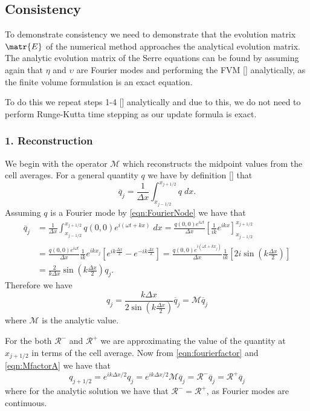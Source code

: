 \subsection{Consistency}
To demonstrate consistency we need to demonstrate that the evolution matrix $\matr{E}$ of the numerical method approaches the analytical evolution matrix. The analytic evolution matrix of the Serre equations can be found by assuming  again that $\eta$ and $\upsilon$ are Fourier modes and performing the FVM [] analytically, as the finite volume formulation is an exact equation.

To do this we repeat steps 1-4 [] analytically and due to this, we do not need to perform Runge-Kutta time stepping as our update formula is exact. 

\subsubsection{1. Reconstruction} 
We begin with the operator $\mathcal{M}$ which reconstructs the midpoint values from the cell averages. For a general quantity $q$ we have by definition [] that
\begin{equation*}
\overline{q}_j = \frac{1}{\Delta x} \int_{x_{j-1/2}}^{x_{j+1/2}} q \; dx.
\end{equation*}
Assuming $q$ is a Fourier mode by \eqref{eqn:FourierNode} we have that
\begin{align*}
\overline{q}_j &= \frac{1}{\Delta x} \int_{x_{j-1/2}}^{x_{j+1/2}} q(0,0) e^{i\left(\omega t + kx\right)} \; dx = \frac{q(0,0)e^{i \omega  t}}{\Delta x} \left[\frac{1}{ik} e^{ikx}\right]_{x_{j-1/2}}^{x_{j+1/2}} \\
&= \frac{q(0,0)e^{i \omega  t}}{\Delta x} \frac{1}{ik} e^{ikx_j} \left[ e^{ik\frac{\Delta x}{2}} - e^{-ik\frac{\Delta x}{2}}\right] = \frac{q(0,0)e^{i \left(\omega  t + kx_j \right)}}{\Delta x} \frac{1}{ik} \left[ 2 i \sin \left(k\frac{\Delta x}{2}\right)\right]\\
&=  \frac{2}{k\Delta x} \sin \left(k\frac{\Delta x}{2}\right) q_j.
\end{align*}
Therefore we have
\begin{equation}
q_j =  \frac{k\Delta x}{2 \sin \left(k\frac{\Delta x}{2}\right)  } \overline{q}_j = \mathcal{M}  \overline{q}_j
\label{eqn:MfactorA}
\end{equation}
where $\mathcal{M}$ is the analytic value.

For the both $\mathcal{R}^-$ and $\mathcal{R}^+$ we are approximating the value of the quantity at $x_{j+1/2}$ in terms of the cell average. Now from \eqref{eqn:fourierfactor} and \eqref{eqn:MfactorA} we have that
\begin{equation}
q_{j+1/2} = e^{i {k\Delta x}/{2}}q_{j} = e^{i {k\Delta x}/{2}}\mathcal{M}\overline{q}_j = \mathcal{R}^- \overline{q}_j = \mathcal{R}^+ \overline{q}_j
\label{eqn:RfactorA}
\end{equation}
where for the analytic solution we have that $\mathcal{R}^-=\mathcal{R}^+$, as Fourier modes are continuous.

